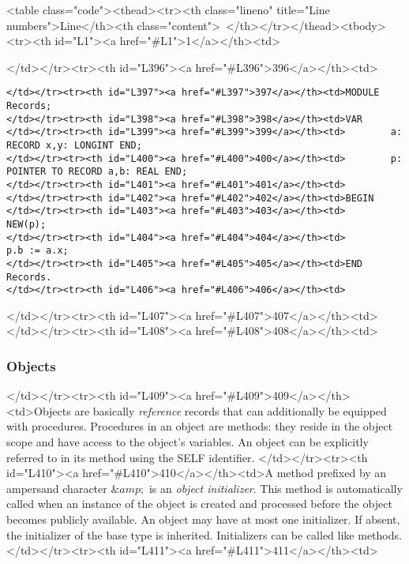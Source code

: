 <table class="code"><thead><tr><th class="lineno" title="Line numbers">Line</th><th class="content"> </th></tr></thead><tbody><tr><th id="L1"><a href="#L1">1</a></th><td>\documentclass[a4paper,11pt]{article}
\begin{document}
</td></tr><tr><th id="L396"><a href="#L396">396</a></th><td>\begin{lstlisting}[language=Oberon,frame=none,caption=Using records]
</td></tr><tr><th id="L397"><a href="#L397">397</a></th><td>MODULE Records;
</td></tr><tr><th id="L398"><a href="#L398">398</a></th><td>VAR
</td></tr><tr><th id="L399"><a href="#L399">399</a></th><td>        a: RECORD x,y: LONGINT END;
</td></tr><tr><th id="L400"><a href="#L400">400</a></th><td>        p: POINTER TO RECORD a,b: REAL END;
</td></tr><tr><th id="L401"><a href="#L401">401</a></th><td>
</td></tr><tr><th id="L402"><a href="#L402">402</a></th><td>BEGIN
</td></tr><tr><th id="L403"><a href="#L403">403</a></th><td>        NEW(p);
</td></tr><tr><th id="L404"><a href="#L404">404</a></th><td>        p.b := a.x;
</td></tr><tr><th id="L405"><a href="#L405">405</a></th><td>END Records.
</td></tr><tr><th id="L406"><a href="#L406">406</a></th><td>\end{lstlisting}
</td></tr><tr><th id="L407"><a href="#L407">407</a></th><td>
</td></tr><tr><th id="L408"><a href="#L408">408</a></th><td>\subsubsection{Objects}\label{section:Objects}
</td></tr><tr><th id="L409"><a href="#L409">409</a></th><td>Objects are basically {\em reference} records that can additionally be equipped with procedures. Procedures in an object are methods: they reside in the object scope and have access to the object's variables. An object can be explicitly referred to in its method using the SELF identifier.
</td></tr><tr><th id="L410"><a href="#L410">410</a></th><td>A method prefixed by an ampersand character $\&amp;$ is an \emph{object initializer}. This method is automatically called when an instance of the object is created and processed before the object becomes publicly available. An object may have at most one initializer. If absent, the initializer of the base type is inherited. Initializers can be called like methods.
</td></tr><tr><th id="L411"><a href="#L411">411</a></th><td>
\end{document}
